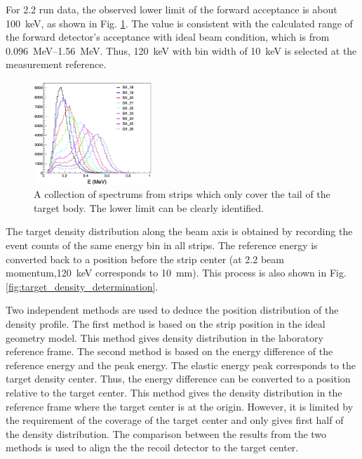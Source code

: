 \documentclass[fleqn,twocolumn,a4paper]{ikpar}
\begin{document}
For \SI{2.2}{\momentum} run data, the observed lower limit of the forward
acceptance is about \SI{100}{\keV}, as shown in Fig. \ref{fig:spectrums}.
The value is consistent with the calculated range of the forward detector's
acceptance with ideal beam condition, which is from \SIrange{0.096}{1.56}{\MeV}.
Thus, \SI{120}{keV} with bin width of \SI{10}{\keV} is selected at the
measurement reference.
\begin{figure}[htb!]
  \centering
	\includegraphics[width=0.4\textwidth]{./spectrums.png}
  \caption{A collection of spectrums from strips which only cover the tail of
    the target body. The lower limit can be clearly identified.}
  \label{fig:spectrums}
\end{figure}
The target density distribution along the beam axis is obtained by recording the event counts of the same energy bin in all strips.
The reference energy is converted back to a position before the strip center
(at \SI{2.2}{\momentum} beam momentum,\SI{120}{\keV} corresponds to \SI{10}{\mm}).
This process is also shown in Fig.\ref{fig:target_density_determination}.

\par
\medskip
Two independent methods are used to deduce the position distribution of the density profile.
The first method is based on the strip position in the ideal geometry model.
This method gives density distribution in the laboratory reference frame.
The second method is based on the energy difference of the reference energy and
the peak energy.
The elastic energy peak corresponds to the target density center.
Thus, the energy difference can be converted to a position relative to the target center. 
This method gives the density distribution in the reference frame where the
target center is at the origin.
However, it is limited by the requirement of the coverage of the target center and only gives first half of the density distribution.
The comparison between the results from the two methods is used to align the the recoil detector to the target center.
\end{document}
